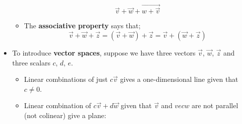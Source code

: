 \begin{itemize}
\begin{itemize}
            \begin{equation}
                \vec{v}+\vec{w}+\vec{w+\vec{v}}
                \label{eq:}
            \end{equation}
            \item The \textbf{associative property} says that;
            \begin{equation}
                \vec{v}+\vec{w}+\vec{z}=(\vec{v}+\vec{w})+\vec{z}=\vec{v}+(\vec{w}+\vec{z})
                \label{eq:}
            \end{equation}
            
        \end{itemize}
    \item To introduce \textbf{vector spaces}, suppose we have three vectors $\vec{v}$, $\vec{w}$, $\vec{z}$ and three scalars $c$, $d$, $e$.
    \begin{itemize}
        \item Linear combinations of just $c\vec{v}$ gives a one-dimensional line given that $c\neq 0$.
        \begin{center}
        \end{center}
        \item Linear combination of $c\vec{v}+d\vec{w}$ given that $\vec{v}$ and $vec{w}$ are not parallel (not colinear) give a plane:
        \begin{center}
\end{center}
\end{itemize}
\end{itemize}
